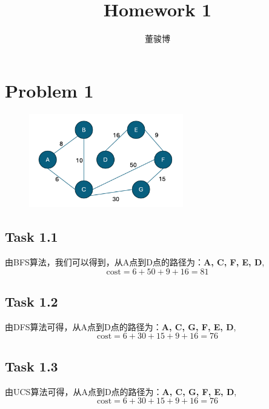 \documentclass[onecolumn,oneside]{SUSTechHomework}
\author{董骏博}
\title{Homework 1}
\begin{document}
    \maketitle
  
    \section*{Problem 1}
    \begin{figure}[h]
        \centering
        \includegraphics[width=0.6\textwidth]{task1.png} %
        \label{fig:example} %
    \end{figure}

    \subsection*{Task 1.1}
    由BFS算法，我们可以得到，从A点到D点的路径为：\textbf{A, C, F, E, D},\[\text{cost} = 6 + 50 + 9 + 16 = 81 \]

    \subsection*{Task 1.2}
    由DFS算法可得，从A点到D点的路径为：\textbf{A, C, G, F, E, D},\[\text{cost} = 6 + 30 + 15 + 9 + 16 = 76 \]

    \subsection*{Task 1.3}
    由UCS算法可得，从A点到D点的路径为：\textbf{A, C, G, F, E, D},\[\text{cost} = 6 + 30 + 15 + 9 + 16 = 76 \]

    \newpage
\end{document}
